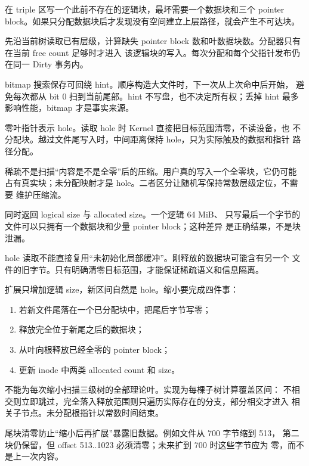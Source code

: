 在 triple 区写一个此前不存在的逻辑块，最坏需要一个数据块和三个 pointer
block。如果只分配数据块后才发现没有空间建立上层路径，就会产生不可达块。

 先沿当前树读取已有层级，计算缺失
pointer block 数和叶数据块数。分配器只有在当前 free count 足够时才进入
该逻辑块的写入。每次分配和每个父指针发布仍在同一 Dirty 事务内。

bitmap 搜索保存可回绕 hint。顺序构造大文件时，下一次从上次命中后开始，
避免每次都从 bit 0 扫到当前尾部。hint 不写盘，也不决定所有权；丢掉 hint
最多影响性能，bitmap 才是事实来源。

零叶指针表示 hole。读取 hole 时 Kernel 直接把目标范围清零，不读设备，也
不分配块。越过文件尾写入时，中间距离保持 hole，只为实际触及的数据和指针
路径分配。

稀疏不是扫描“内容是不是全零”后的压缩。用户真的写入一个全零块，它仍可能
占有真实块；未分配映射才是 hole。二者区分让随机写保持常数层级定位，不需要
维护压缩流。

 同时返回 logical size 与 allocated size。一个逻辑 64 MiB、
只写最后一个字节的文件可以只拥有一个数据块和少量 pointer block；这种差异
是正确结果，不是块泄漏。

\begin{failurebox}
hole 读取不能直接复用“未初始化局部缓冲”。刚释放的数据块可能含有另一个
文件的旧字节。只有明确清零目标范围，才能保证稀疏语义和信息隔离。
\end{failurebox}

扩展只增加逻辑 size，新区间自然是 hole。缩小要完成四件事：

\begin{enumerate}
  \item 若新文件尾落在一个已分配块中，把尾后字节写零；
  \item 释放完全位于新尾之后的数据块；
  \item 从叶向根释放已经全零的 pointer block；
  \item 更新 inode 中两类 allocated count 和 size。
\end{enumerate}

不能为每次缩小扫描三级树的全部理论叶。实现为每棵子树计算覆盖区间：
不相交则立即跳过，完全落入释放范围则只遍历实际存在的分支，部分相交才进入
相关子节点。未分配根指针以常数时间结束。

尾块清零防止“缩小后再扩展”暴露旧数据。例如文件从 700 字节缩到 513，
第二块仍保留，但 offset 513..1023 必须清零；未来扩到 700 时这些字节应为
零，而不是上一次内容。


